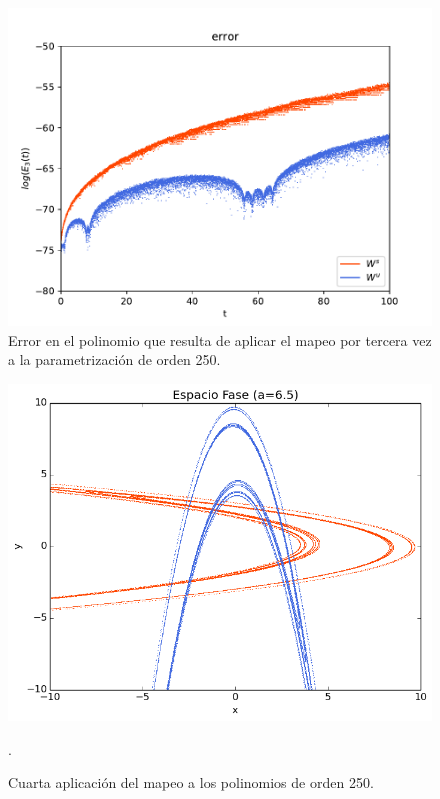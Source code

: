\begin{figure}[H]
\centering
\includegraphics[scale=0.4]{error3ite}
\caption{Error en el polinomio que resulta de aplicar el mapeo por tercera vez a la parametrización de orden 250.}
\label{error-3iteracion}
\end{figure}

\begin{figure}[H]
\centering
\includegraphics[scale=0.5]{rectangulo4A}
\caption{Cuarta aplicación del mapeo a los polinomios de orden 250.}.
\label{Rectangulo4}
\end{figure}

